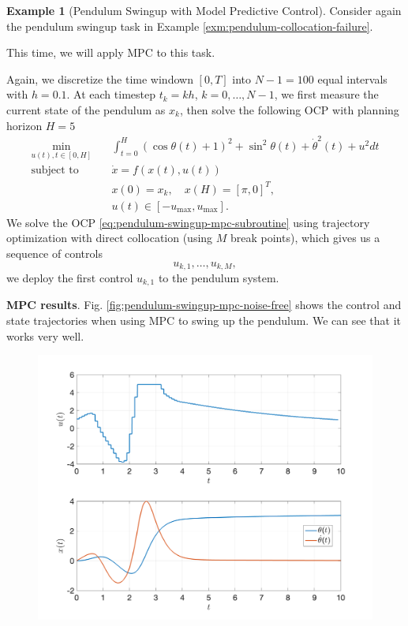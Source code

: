 \documentclass[
]{book}
\theoremstyle{definition}
\theoremstyle{definition}
\newtheorem{example}{Example}[chapter]
\theoremstyle{definition}
\theoremstyle{definition}
\theoremstyle{remark}
\begin{document}
\begin{example}[Pendulum Swingup with Model Predictive Control]
\protect\hypertarget{exm:mpc-pendulum-swingup}{}\label{exm:mpc-pendulum-swingup}Consider again the pendulum swingup task in Example \ref{exm:pendulum-collocation-failure}.

This time, we will apply MPC to this task.

Again, we discretize the time windown \([0,T]\) into \(N-1 = 100\) equal intervals with \(h = 0.1\). At each timestep \(t_k = kh\), \(k=0,\dots,N-1\), we first measure the current state of the pendulum as \(x_k\), then solve the following OCP with planning horizon \(H=5\)
\begin{equation}
\begin{split} \min_{u(t), t \in [0,H]} & \quad \int_{t=0}^H (\cos \theta(t) + 1)^2 + \sin^2\theta(t) + \dot{\theta}^2(t) + u^2 dt \\
\text{subject to} & \quad \dot{x} = f(x(t),u(t)) \\
& \quad x(0) = x_k, \quad x(H) = [\pi,0]^T, \\
& \quad u(t) \in [-u_{\max},u_{\max}].
\end{split}
\label{eq:pendulum-swingup-mpc-subroutine}
\end{equation}
We solve the OCP \eqref{eq:pendulum-swingup-mpc-subroutine} using trajectory optimization with direct collocation (using \(M\) break points), which gives us a sequence of controls
\[
u_{k,1},\dots,u_{k,M},
\]
we deploy the first control \(u_{k,1}\) to the pendulum system.

\textbf{MPC results}. Fig. \ref{fig:pendulum-swingup-mpc-noise-free} shows the control and state trajectories when using MPC to swing up the pendulum. We can see that it works very well.

\begin{figure}

{\centering \includegraphics[width=0.8\linewidth]{images/pendulum_mpc_noise_free} 

}
\end{figure}
\end{example}
\end{document}
